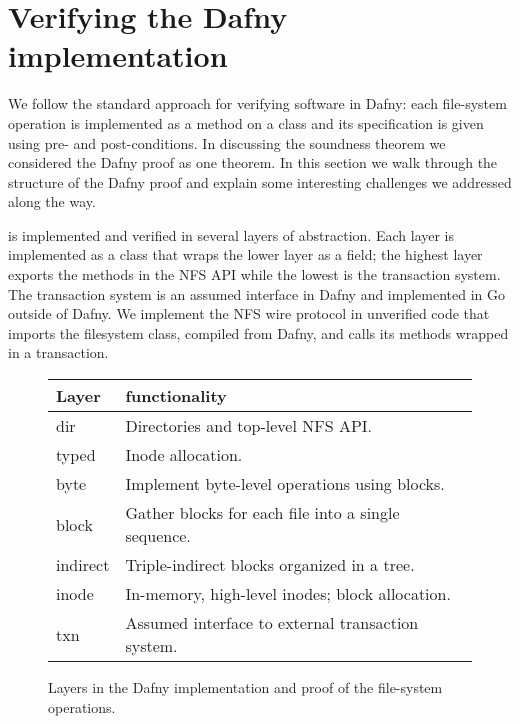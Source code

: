 \section{Verifying the Dafny implementation}%
\label{sec:design}

We follow the standard approach for verifying software in Dafny: each
file-system operation is implemented as a method on a class and its
specification is given using pre- and post-conditions. In discussing the
soundness theorem we considered the Dafny proof as one theorem. In this
section we walk through the structure of the Dafny proof and explain some interesting
challenges we addressed along the way.


\sys is implemented and verified in several layers of abstraction. Each layer is
implemented as a class that wraps the lower layer as a field; the highest layer
exports the methods in the NFS API while the lowest is the transaction system.
The transaction system is an assumed interface in Dafny and implemented in Go
outside of Dafny. We implement the NFS wire protocol in unverified code that
imports the filesystem class, compiled from Dafny, and calls its methods wrapped
in a transaction.


\begin{figure}
\begin{tabular}{ll}
  \toprule
  \textbf{Layer} & \textbf{functionality} \\
  \midrule
  dir & Directories and top-level NFS API. \\
  typed & Inode allocation. \\
  byte & Implement byte-level operations using blocks. \\
  block & Gather blocks for each file into a single sequence. \\
  indirect & Triple-indirect blocks organized in a tree. \\
  inode & In-memory, high-level inodes; block allocation. \\
  txn & Assumed interface to external transaction system. \\
  \bottomrule
\end{tabular}
\caption{Layers in the Dafny implementation and proof of the file-system
operations.}
\label{fig:dafny-layers}
\end{figure}

